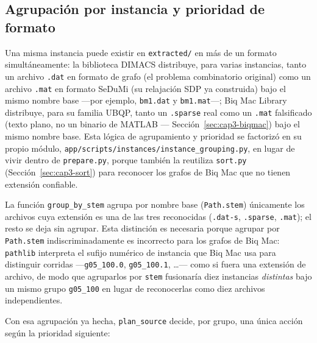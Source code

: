 \subsection{Agrupaci\'on por instancia y prioridad de formato}
\label{sec:cap3-grouping}

Una misma instancia puede existir en \texttt{extracted/} en m\'as de un
formato simult\'aneamente: la biblioteca DIMACS distribuye, para varias
instancias, tanto un archivo \texttt{.dat} en formato de grafo (el problema
combinatorio original) como un archivo \texttt{.mat} en formato SeDuMi (su
relajaci\'on SDP ya construida) bajo el mismo nombre base —por ejemplo,
\texttt{bm1.dat} y \texttt{bm1.mat}—; Biq Mac Library distribuye, para su
familia UBQP, tanto un \texttt{.sparse} real como un \texttt{.mat}
falsificado (texto plano, no un binario de MATLAB —
Secci\'on~\ref{sec:cap3-biqmac}) bajo el mismo nombre base. Esta l\'ogica de
agrupamiento y prioridad se factoriz\'o en su propio m\'odulo,
\texttt{app/scripts/instances/instance\_grouping.py}, en lugar de vivir
dentro de \texttt{prepare.py}, porque tambi\'en la reutiliza
\texttt{sort.py} (Secci\'on~\ref{sec:cap3-sort}) para reconocer los grafos
de Biq Mac que no tienen extensi\'on confiable.

La funci\'on \texttt{group\_by\_stem} agrupa por nombre base
(\texttt{Path.stem}) \'unicamente los archivos cuya extensi\'on es una de
las tres reconocidas (\texttt{.dat-s}, \texttt{.sparse}, \texttt{.mat}); el
resto se deja sin agrupar. Esta distinci\'on es necesaria porque agrupar
por \texttt{Path.stem} indiscriminadamente es incorrecto para los grafos de
Biq Mac: \texttt{pathlib} interpreta el sufijo num\'erico de instancia que
Biq Mac usa para distinguir corridas —\texttt{g05\_100.0},
\texttt{g05\_100.1}, \ldots— como si fuera una extensi\'on de archivo, de
modo que agruparlos por \texttt{stem} fusionar\'ia diez instancias
\emph{distintas} bajo un mismo grupo \texttt{g05\_100} en lugar de
reconocerlas como diez archivos independientes.

Con esa agrupaci\'on ya hecha, \texttt{plan\_source} decide, por grupo, una
\'unica acci\'on seg\'un la prioridad siguiente:

